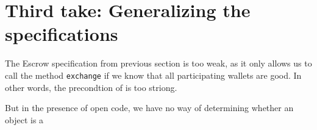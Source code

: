 \documentclass[acmsmall,review,anonymous,screen]{acmart}\settopmatter{printfolios=true,printacmref=false}
\newcommand{\CanTrade}{\mbox{\texttt{Trades}}}
\begin{document}
 \section{Third take: Generalizing the specifications}
 
 The Escrow specification from previous section is too weak, as it only allows us to call the method \texttt{exchange} if we know that all participating wallets are good.
 In other words, the precondtion of  is too striong.
 
  But in the presence of open code, we have no way of determining whether an object is a 


    
\end{document}
